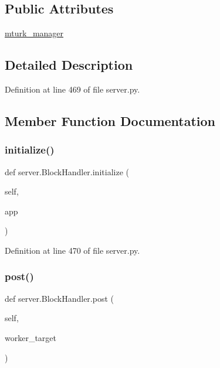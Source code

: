 \subsection*{Public Attributes}
\begin{DoxyCompactItemize}
\item 
\hyperlink{classserver_1_1BlockHandler_a2edbf1b3f694d2b64432c1c69815aa48}{mturk\+\_\+manager}
\end{DoxyCompactItemize}


\subsection{Detailed Description}


Definition at line 469 of file server.\+py.



\subsection{Member Function Documentation}
\mbox{\label{classserver_1_1BlockHandler_a292141ced99cfa63ae7434480cb82ac4}} 
\subsubsection{\texorpdfstring{initialize()}{initialize()}}
{\footnotesize\ttfamily def server.\+Block\+Handler.\+initialize (\begin{DoxyParamCaption}\item[{}]{self,  }\item[{}]{app }\end{DoxyParamCaption})}



Definition at line 470 of file server.\+py.

\mbox{\label{classserver_1_1BlockHandler_a0c9197b9bce91acb74d1a2da95554d49}} 
\subsubsection{\texorpdfstring{post()}{post()}}
{\footnotesize\ttfamily def server.\+Block\+Handler.\+post (\begin{DoxyParamCaption}\item[{}]{self,  }\item[{}]{worker\+\_\+target }\end{DoxyParamCaption})}




